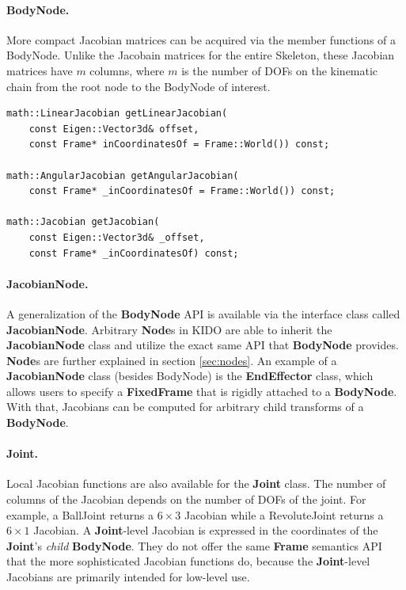 

\paragraph{BodyNode.} More compact Jacobian matrices can be acquired
via the member functions of a BodyNode. Unlike the Jacobain matrices
for the entire Skeleton, these Jacobian matrices have $m$ columns, where $m$ is the number of DOFs on the kinematic chain from the root node to the BodyNode of interest.


\begin{lstlisting}[caption=BodyNode.h]
math::LinearJacobian getLinearJacobian(
    const Eigen::Vector3d& offset, 
    const Frame* inCoordinatesOf = Frame::World()) const;

math::AngularJacobian getAngularJacobian(
    const Frame* _inCoordinatesOf = Frame::World()) const;

math::Jacobian getJacobian(
    const Eigen::Vector3d& _offset, 
    const Frame* _inCoordinatesOf) const;
\end{lstlisting}

\paragraph{JacobianNode.} A generalization of the \textbf{BodyNode} API is available via the interface class called \textbf{JacobianNode}. Arbitrary \textbf{Node}s in KIDO are able to inherit the \textbf{JacobianNode} class and utilize the exact same API that \textbf{BodyNode} provides. \textbf{Node}s are further explained in section \ref{sec:nodes}. An example of a \textbf{JacobianNode} class (besides BodyNode) is the \textbf{EndEffector} class, which allows users to specify a \textbf{FixedFrame} that is rigidly attached to a \textbf{BodyNode}. With that, Jacobians can be computed for arbitrary child transforms of a \textbf{BodyNode}.

\paragraph{Joint.} Local Jacobian functions are also available for
the \textbf{Joint} class. The number of columns of the Jacobian depends on the
number of DOFs of the joint. For example, a BallJoint returns a $6
\times 3$ Jacobian while a RevoluteJoint returns a $6 \times 1$ Jacobian. A \textbf{Joint}-level Jacobian is expressed in the coordinates of the \textbf{Joint}'s \textit{child} \textbf{BodyNode}. They do not offer the same \textbf{Frame} semantics API that the more sophisticated Jacobian functions do, because the \textbf{Joint}-level Jacobians are primarily intended for low-level use.

